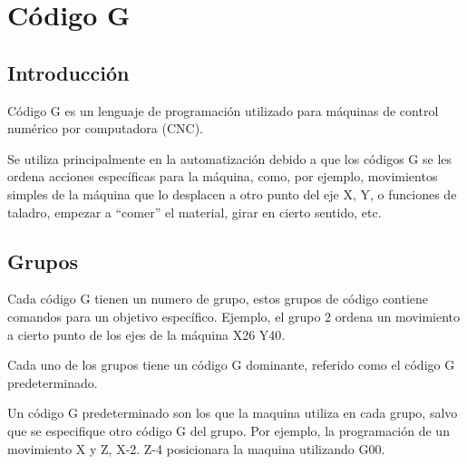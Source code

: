 \documentclass[../main.tex]{subfiles}
\begin{document}
\renewcommand{\subsectionbreak}{}
\section{Código G}

	\subsection{Introducción}

	Código G es un lenguaje de programación utilizado para máquinas de control numérico
	por computadora (CNC).

	Se utiliza principalmente en la automatización debido a que los códigos G se les
	ordena acciones específicas para la máquina, como, por ejemplo, movimientos simples
	de la máquina que lo desplacen a otro punto del eje X, Y, o funciones de taladro, 
	empezar a ``comer'' el material, girar en cierto sentido, etc.

	\subsection{Grupos}

	Cada código G tienen un numero de grupo, estos grupos de código contiene comandos
	para un objetivo específico. Ejemplo, el grupo 2 ordena un movimiento a cierto punto
	de los ejes de la máquina X26 Y40.

	Cada uno de los grupos tiene un código G dominante, 
	referido como el código G predeterminado.

	Un código G predeterminado son los que la maquina utiliza en cada grupo, salvo que se 
	especifique otro código G del grupo. Por ejemplo, la programación de un movimiento
	X y Z,  X-2. Z-4 posicionara la maquina utilizando G00.
\end{document}
